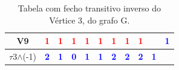\documentclass{report}
\begin{document}
\begin{table}[h]
\begin{tabular}{|c|c|c|c|c|c|c|c|c|c|c|}
        \hline
        \textbf{V9} & \textbf{\textcolor{red}{1}} & \textbf{\textcolor{red}{1}} & \textbf{\textcolor{red}{1}} & \textbf{\textcolor{red}{1}} & \textbf{\textcolor{red}{1}} & \textbf{\textcolor{red}{1}} & \textbf{\textcolor{red}{1}} & \textbf{\textcolor{red}{1}} & & \textbf{\textcolor{blue}{1}} \\
        \hline
        \textit{\textbf{$\tau$}}3$\wedge$(-1) & \textbf{\textcolor{blue}{2}} & \textbf{\textcolor{blue}{1}}
        & \textbf{\textcolor{blue}{0}} & \textbf{\textcolor{blue}{1}} & \textbf{\textcolor{blue}{1}} & \textbf{\textcolor{blue}{2}} & \textbf{\textcolor{blue}{2}} & \textbf{\textcolor{blue}{2}} & \textbf{\textcolor{blue}{1}} & \\
          \hline
         \end{tabular}         
    \caption{Tabela com fecho transitivo inverso do Vértice 3, do grafo G.}

\end{table}
\end{document}
